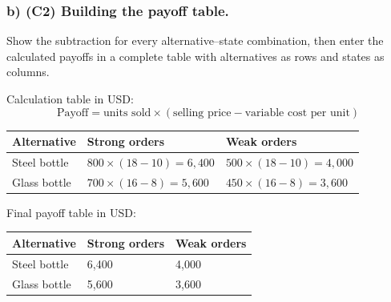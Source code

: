 \subsubsection*{b) \textbf{(C2)} Building the payoff table.}
\label{subsec:problem3-reusable-bottle-workshop-c2}
Show the subtraction for every alternative--state combination, then enter the calculated payoffs in a complete table with alternatives as rows and states as columns.

Calculation table in USD:
\[
\text{Payoff}=\text{units sold}\times(\text{selling price}-\text{variable cost per unit})
\]
\begin{center}
\small
\begin{tabular}{lll}
\toprule
Alternative & Strong orders & Weak orders \\
\midrule
Steel bottle & $800 \times (18 - 10) = 6{,}400$ & $500 \times (18 - 10) = 4{,}000$ \\
Glass bottle & $700 \times (16 - 8) = 5{,}600$ & $450 \times (16 - 8) = 3{,}600$ \\
\bottomrule
\end{tabular}
\end{center}

Final payoff table in USD:
\begin{center}
\begin{tabular}{lll}
\toprule
Alternative & Strong orders & Weak orders \\
\midrule
Steel bottle & 6{,}400 & 4{,}000 \\
Glass bottle & 5{,}600 & 3{,}600 \\
\bottomrule
\end{tabular}
\end{center}
